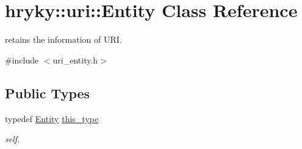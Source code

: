 \hypertarget{classhryky_1_1uri_1_1_entity}{\section{hryky\-:\-:uri\-:\-:Entity Class Reference}
\label{classhryky_1_1uri_1_1_entity}
}


retains the information of U\-R\-I.  




{\ttfamily \#include $<$uri\-\_\-entity.\-h$>$}

\subsection*{Public Types}
\begin{DoxyCompactItemize}
\item 
\hypertarget{classhryky_1_1uri_1_1_entity_ab22b480936b068a0cbe702a2d4345f90}{typedef \hyperlink{classhryky_1_1uri_1_1_entity}{Entity} \hyperlink{classhryky_1_1uri_1_1_entity_ab22b480936b068a0cbe702a2d4345f90}{this\-\_\-type}}\label{classhryky_1_1uri_1_1_entity_ab22b480936b068a0cbe702a2d4345f90}

\begin{DoxyCompactList}\small\item\em self. \end{DoxyCompactList}\end{DoxyCompactItemize}
